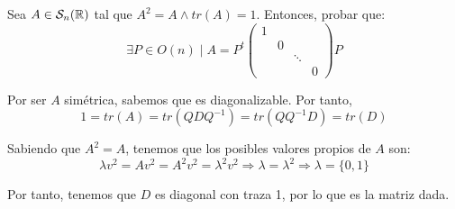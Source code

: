 \begin{ejercicio}
    Sea $A\in \mathcal{S}_n(\mathbb{R})$ tal que $A^2=A \land tr(A)=1$. Entonces, probar que:
    \begin{equation*}
        \exists P\in O(n) \mid A=P^t \left( \begin{array}{cccc}
            1 &  \\
             & 0 \\
             && \ddots \\
             &&& 0
        \end{array}\right) P
    \end{equation*}

    
    Por ser $A$ simétrica, sabemos que es diagonalizable. Por tanto,
    \begin{equation*}
        1 = tr(A)=tr(QDQ^{-1}) = tr(QQ^{-1}D) = tr(D)
    \end{equation*}

    Sabiendo que $A^2=A$, tenemos que los posibles valores propios de $A$ son:
    \begin{equation*}
        \lambda v^2 = Av^2 = A^2v^2 = \lambda^2v^2 \Longrightarrow \lambda=\lambda^2 \Longrightarrow \lambda = \{0,1\}
    \end{equation*}

    Por tanto, tenemos que $D$ es diagonal con traza 1, por lo que es la matriz dada.
\end{ejercicio}


